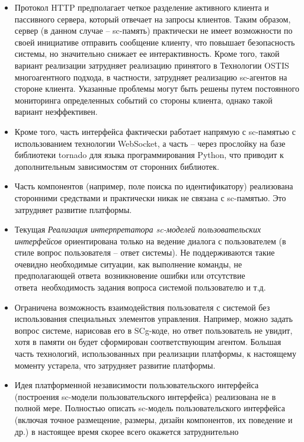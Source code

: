 \begin{itemize}
    \item Протокол HTTP предполагает четкое разделение активного клиента и пассивного сервера, который отвечает
    на запросы клиентов. Таким образом, сервер (в данном случае -- sc-память) практически не имеет возможности по
    своей инициативе отправить сообщение клиенту, что повышает безопасность системы, но значительно снижает ее
    интерактивность. Кроме того, такой вариант реализации затрудняет реализацию принятого в Технологии OSTIS
    многоагентного подхода, в частности, затрудняет реализацию sc-агентов на стороне клиента. Указанные проблемы
    могут быть решены путем постоянного мониторинга определенных событий со стороны клиента, однако такой вариант
    неэффективен.
    \item Кроме того, часть интерфейса фактически работает напрямую с sc-памятью с использованием технологии
    WebSocket, а часть -- через прослойку на базе библиотеки tornado для языка программирования Python,
    что приводит к дополнительным зависимостям от сторонних библиотек.
    \item Часть компонентов (например, поле поиска по идентификатору) реализована сторонними средствами и практически
    никак не связана с sc-памятью. Это затрудняет развитие платформы.
    \item Текущая \textit{Реализация интерпретатора sc-моделей пользовательских интерфейсов} ориентирована только на
    ведение диалога с пользователем (в стиле вопрос пользователя -- ответ системы). Не поддерживаются такие очевидно
    необходимые ситуации, как выполнение команды, не предполагающей ответа~возникновение ошибки или отсутствие
    ответа~необходимость задания вопроса системой пользователю и т.д.
    \item Ограничена возможность взаимодействия пользователя с системой без использования специальных элементов
    управления. Например, можно задать вопрос системе, нарисовав его в SCg-коде, но ответ пользователь не увидит, хотя
    в памяти он будет сформирован соответствующим агентом. Большая часть технологий, использованных при реализации
    платформы, к настоящему моменту устарела, что затрудняет развитие платформы.
    \item Идея платформенной независимости пользовательского интерфейса (построения sc-модели пользовательского
    интерфейса) реализована не в полной мере. Полностью описать sc-модель пользовательского интерфейса (включая точное
    размещение, размеры, дизайн компонентов, их поведение и др.) в настоящее время скорее всего окажется затруднительно

\end{itemize}
